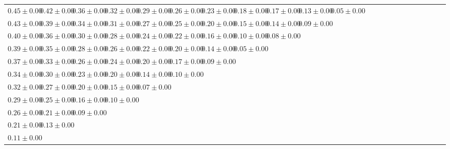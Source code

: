 \begin{table}[ht]
{{\begin{adjustbox}{width=\textwidth}
\begin{tabular}{ccccccccccccccccccccccc}
$0.45 \pm 0.00$ & $0.42 \pm 0.00$ & $0.36 \pm 0.00$ & $0.32 \pm 0.00$ & $0.29 \pm 0.00$ & $0.26 \pm 0.00$ & $0.23 \pm 0.00$ & $0.18 \pm 0.00$ & $0.17 \pm 0.00$ & $0.13 \pm 0.00$ & $0.05 \pm 0.00$ &  &  &  &  &  &  &  &  &  &  &  &  \\
$0.43 \pm 0.00$ & $0.39 \pm 0.00$ & $0.34 \pm 0.00$ & $0.31 \pm 0.00$ & $0.27 \pm 0.00$ & $0.25 \pm 0.00$ & $0.20 \pm 0.00$ & $0.15 \pm 0.00$ & $0.14 \pm 0.00$ & $0.09 \pm 0.00$ &  &  &  &  &  &  &  &  &  &  &  &  &  \\
$0.40 \pm 0.00$ & $0.36 \pm 0.00$ & $0.30 \pm 0.00$ & $0.28 \pm 0.00$ & $0.24 \pm 0.00$ & $0.22 \pm 0.00$ & $0.16 \pm 0.00$ & $0.10 \pm 0.00$ & $0.08 \pm 0.00$ &  &  &  &  &  &  &  &  &  &  &  &  &  &  \\
$0.39 \pm 0.00$ & $0.35 \pm 0.00$ & $0.28 \pm 0.00$ & $0.26 \pm 0.00$ & $0.22 \pm 0.00$ & $0.20 \pm 0.00$ & $0.14 \pm 0.00$ & $0.05 \pm 0.00$ &  &  &  &  &  &  &  &  &  &  &  &  &  &  &  \\
$0.37 \pm 0.00$ & $0.33 \pm 0.00$ & $0.26 \pm 0.00$ & $0.24 \pm 0.00$ & $0.20 \pm 0.00$ & $0.17 \pm 0.00$ & $0.09 \pm 0.00$ &  &  &  &  &  &  &  &  &  &  &  &  &  &  &  &  \\
$0.34 \pm 0.00$ & $0.30 \pm 0.00$ & $0.23 \pm 0.00$ & $0.20 \pm 0.00$ & $0.14 \pm 0.00$ & $0.10 \pm 0.00$ &  &  &  &  &  &  &  &  &  &  &  &  &  &  &  &  &  \\
$0.32 \pm 0.00$ & $0.27 \pm 0.00$ & $0.20 \pm 0.00$ & $0.15 \pm 0.00$ & $0.07 \pm 0.00$ &  &  &  &  &  &  &  &  &  &  &  &  &  &  &  &  &  &  \\
$0.29 \pm 0.00$ & $0.25 \pm 0.00$ & $0.16 \pm 0.00$ & $0.10 \pm 0.00$ &  &  &  &  &  &  &  &  &  &  &  &  &  &  &  &  &  &  &  \\
$0.26 \pm 0.00$ & $0.21 \pm 0.00$ & $0.09 \pm 0.00$ &  &  &  &  &  &  &  &  &  &  &  &  &  &  &  &  &  &  &  &  \\
$0.21 \pm 0.00$ & $0.13 \pm 0.00$ &  &  &  &  &  &  &  &  &  &  &  &  &  &  &  &  &  &  &  &  &  \\
$0.11 \pm 0.00$ &  &  &  &  &  &  &  &  &  &  &  &  &  &  &  &  &  &  &  &  &  &  \\


\end{tabular}
\end{adjustbox}}}
\end{table}
